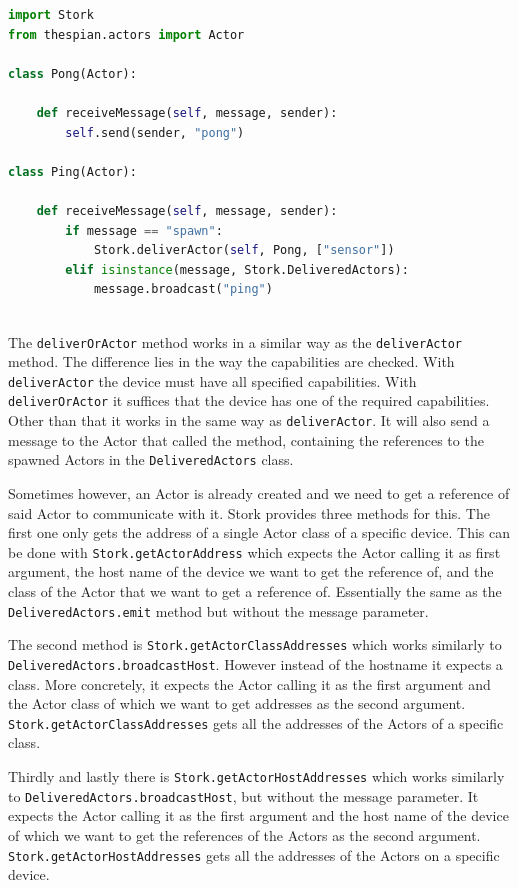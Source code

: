 \documentclass[a4paper]{article}
\begin{document}
\begin{lstlisting}[language=Python, caption=Receiving the references of the spawned Actors and broadcasting "ping", label=lst:receive]
import Stork
from thespian.actors import Actor

class Pong(Actor):

    def receiveMessage(self, message, sender):
        self.send(sender, "pong")

class Ping(Actor):

    def receiveMessage(self, message, sender):
        if message == "spawn":
            Stork.deliverActor(self, Pong, ["sensor"])
        elif isinstance(message, Stork.DeliveredActors):
            message.broadcast("ping")
        
\end{lstlisting}

The \lstinline{deliverOrActor} method works in a similar way as the \lstinline{deliverActor} method. The difference lies in the way the capabilities are checked. With \lstinline|deliverActor| the device must have all specified capabilities. With \lstinline|deliverOrActor| it suffices that the device has one of the required capabilities. Other than that it works in the same way as \lstinline|deliverActor|. It will also send a message to the Actor that called the method, containing the references to the spawned Actors in the \lstinline|DeliveredActors| class.

Sometimes however, an Actor is already created and we need to get a reference of said Actor to communicate with it. Stork provides three methods for this. The first one only gets the address of a single Actor class of a specific device. This can be done with \lstinline|Stork.getActorAddress| which expects the Actor calling it as first argument, the host name of the device we want to get the reference of, and the class of the Actor that we want to get a reference of. Essentially the same as the \lstinline|DeliveredActors.emit| method but without the message parameter.

The second method is \lstinline|Stork.getActorClassAddresses| which works similarly to \lstinline|DeliveredActors.broadcastHost|. However instead of the hostname it expects a class. More concretely, it expects the Actor calling it as the first argument and the Actor class of which we want to get addresses as the second argument. \lstinline|Stork.getActorClassAddresses| gets all the addresses of the Actors of a specific class.

Thirdly and lastly there is \lstinline|Stork.getActorHostAddresses| which works similarly to \lstinline|DeliveredActors.broadcastHost|, but without the message parameter. It expects the Actor calling it as the first argument and the host name of the device of which we want to get the references of the Actors as the second argument. \lstinline|Stork.getActorHostAddresses| gets all the addresses of the Actors on a specific device.
\end{document}
